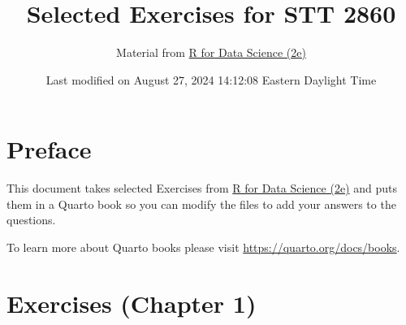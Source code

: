 \documentclass[
  letterpaper,
  DIV=11,
  numbers=noendperiod]{scrreprt}
\title{Selected Exercises for STT 2860}
\author{Material from \href{https://r4ds.hadley.nz/}{R for Data Science
(2e)}}
\date{Last modified on August 27, 2024 14:12:08 Eastern Daylight Time}
\renewcommand*\contentsname{Table of contents}
\newcommand\contentsname{Table of contents}
\begin{document}
\maketitle
\ifdefined\Shaded\renewenvironment{Shaded}{\begin{tcolorbox}[boxrule=0pt, frame hidden, enhanced, interior hidden, sharp corners, borderline west={3pt}{0pt}{shadecolor}, breakable]}{\end{tcolorbox}}\fi

\renewcommand*\contentsname{Table of contents}
{
\hypersetup{linkcolor=}
\setcounter{tocdepth}{2}
\tableofcontents
}

\hypertarget{preface}{%
\chapter*{Preface}\label{preface}}


This document takes selected Exercises from
\href{https://r4ds.hadley.nz/}{R for Data Science (2e)} and puts them in
a Quarto book so you can modify the files to add your answers to the
questions.

To learn more about Quarto books please visit
\url{https://quarto.org/docs/books}.


\hypertarget{exercises-chapter-1}{%
\chapter{Exercises (Chapter 1)}\label{exercises-chapter-1}}
\end{document}
